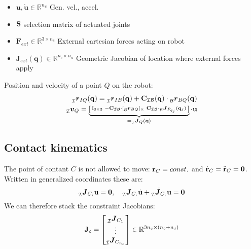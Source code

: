 \documentclass[a4paper, 8pt]{extarticle}
\newcommand{\mvec}[3]{  \prescript{}{\mathcal{#1}}{\bm{#2}}  _{#3} }
\newcommand{\mdvec}[3]{ \prescript{}{\mathcal{#1}}{\dot{\bm #2}} _{#3} }
\newcommand{\mrot}[2]{ \textbf{#1}_{ \mathcal{#2} } }
\begin{document}
\begin{multicols*}{3}
\begin{itemize}
\item $\mathbf{u,\dot u} \in \mathbb{R}^{n_u}$ Gen. vel., accel.
\item $\bf S$ selection matrix of actuated joints
\item $\mathbf{F}_{ext} \in \mathbb{R}^{3\times n_c}$ External cartesian forces acting on robot
\item $\mathbf J_{ext}(\mathbf q) \in \mathbb R^{n_c\times n_u}$ Geometric Jacobian of location where external forces apply
\end{itemize}
\noindent Position and velocity of a point $Q$ on the robot: 
\begin{align*}
\mvec{I}{r}{IQ}({\bf q}) = \mvec{I}{r}{IB}({\bf q}) + \mrot{C}{IB}({\bf q}) \cdot \mvec{B}{r}{BQ}({\bf q})\\
\mvec{I}{v}{Q} = \underbrace{\left[\begin{smallmatrix} \mathbb{I}_{3\times 3} & -\mrot{C}{IB} \cdot [\mvec{B}{r}{BQ}]_{\times} & \mrot{C}{IB} \cdot \mvec{B}{J}{P_{q_j}}({\bf q}_j) \end{smallmatrix}\right]}_{ = \mvec{I}{J}{Q}({\bf q})}\cdot {\bf u}
\end{align*}


\subsection*{Contact kinematics}
The point of contant $C$ is not allowed to move: ${\bf r}_C = const.$ and $\dot{\bf r}_C = \ddot{\bf r}_C = \bm 0$. Written in generalized coordinates these are:
$$\mvec{I}{J}{C_i}{\bf u} = \bm 0, \quad \mvec{I}{J}{C_i}\dot{\bf u} + \mdvec{I}{J}{C_i}{\bf u} = \bm 0$$
We can therefore stack the constraint Jacobians:
$${\bf J}_c = \begin{bmatrix}
\mvec{I}{J}{C_1} \\
\vdots \\
\mvec{I}{J}{C_{n_c}}
\end{bmatrix}
\in \mathbb{R}^{3n_c \times (n_b + n_j)}
$$


\end{multicols*}
\end{document}
